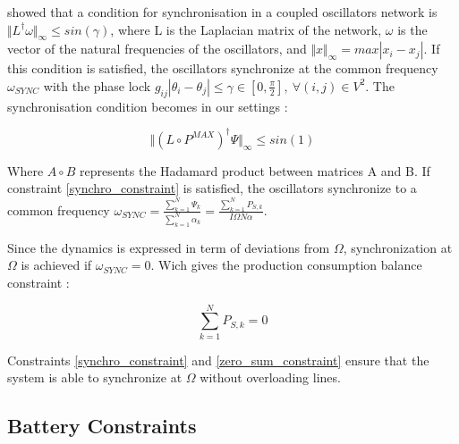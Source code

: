\documentclass[conference]{IEEEtran}
\begin{document}

\cite{Dorfler2013} showed that a condition for synchronisation in a coupled oscillators network is $ \Vert L^{\dagger}\omega \Vert_{\infty} \leq sin(\gamma) $, where L is the Laplacian matrix of the network, $ \omega $ is the vector of the natural frequencies of the oscillators, and $ \Vert x \Vert_{\infty} = max \left| x_i - x_j \right| $. If this condition is satisfied, the oscillators synchronize at the common frequency $ \omega_{SYNC} $ with the phase lock $ g_{ij}\left| \theta_i - \theta_j \right| \leq    \gamma \in[0,\frac{\pi}{2}],\ \forall (i,j) \in V^2 $. The synchronisation condition becomes in our settings :

\begin{equation}
\label{synchro_constraint}
\Vert \left( L \circ P^{MAX} \right)^{\dagger} \Psi \Vert_{\infty} \leq sin(1)
\end{equation}

Where $ A \circ B $ represents the Hadamard product between matrices A and B. If constraint \ref{synchro_constraint} is satisfied, the oscillators synchronize to a common frequency $ \omega_{SYNC} = \frac{\sum_{k=1}^{N}\Psi_k}{\sum_{k=1}^{N}\alpha_k} = \frac{\sum_{k=1}^{N}P_{S,k}}{I\Omega N \alpha}$. 

Since the dynamics is expressed in term of deviations from $ \Omega$, synchronization at $ \Omega $ is achieved if $\omega_{SYNC} = 0 $. Wich gives the production consumption balance constraint :

\begin{equation}
\label{zero_sum_constraint}
\sum_{k=1}^{N} P_{S,k} = 0
\end{equation}

Constraints \ref{synchro_constraint} and \ref{zero_sum_constraint} ensure that the system is able to synchronize at $\Omega$ without overloading lines.


\subsection{Battery Constraints}
\end{document}
